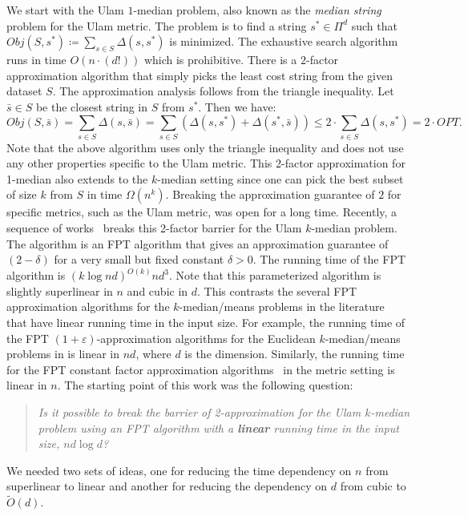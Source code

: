\documentclass[11pt]{llncs}
\newcommand{\veps}{\varepsilon}
\begin{document}
We start with the Ulam $1$-median problem, also known as the {\em median string} problem for the Ulam metric. The problem is to find a string $s^* \in \Pi^d$ such that $Obj(S, s^*) \coloneqq \sum_{s \in S} \Delta(s, s^*)$ is minimized. The exhaustive search algorithm runs in time $O(n \cdot (d!))$ which is prohibitive. There is a $2$-factor approximation algorithm that simply picks the least cost string from the given dataset $S$. The approximation analysis follows from the triangle inequality. Let $\bar{s} \in S$ be the closest string in $S$ from $s^*$. Then we have:
$$
Obj(S, \bar{s}) = \sum_{s \in S} \Delta(s, \bar{s}) = \sum_{s \in S} (\Delta(s, s^*) + \Delta(s^*, \bar{s})) \leq 2 \cdot \sum_{s \in S} \Delta(s, s^*) = 2 \cdot OPT.
$$
Note that the above algorithm uses only the triangle inequality and does not use any other properties specific to the Ulam metric. 
This 2-factor approximation for 1-median also extends to the $k$-median setting since one can pick the best subset of size $k$ from $S$ in time $\Omega(n^k)$. Breaking the approximation guarantee of $2$ for specific metrics, such as the Ulam metric, was open for a long time. Recently, a sequence of works~\cite{cdk21,cdk23} breaks this 2-factor barrier for the Ulam $k$-median problem. The algorithm is an FPT algorithm that gives an approximation guarantee of $(2 - \delta)$ for a very small but fixed constant $\delta > 0$. The running time of the FPT algorithm is $(k \log{nd})^{O(k)} nd^3$. 
Note that this parameterized algorithm is slightly superlinear in $n$ and cubic in $d$.
This contrasts the several FPT approximation algorithms for the $k$-median/means problems in the literature~\cite{kss,jks,bjk18,bgjk20,gj20} that have linear running time in the input size. For example, the running time of the FPT $(1+\veps)$-approximation algorithms for the Euclidean $k$-median/means problems in \cite{kss,jks,bjk18,bgjk20}  is linear in $nd$, where $d$ is the dimension. Similarly, the running time for the FPT constant factor approximation algorithms~\cite{gj20} in the metric setting is linear in $n$. The starting point of this work was the following question: 
\begin{quote}
{\it Is it possible to break the barrier of 2-approximation for the Ulam $k$-median problem using an FPT algorithm with a {\bf linear} running time in the input size, $nd \log{d}$?}
\end{quote}
We needed two sets of ideas, one for reducing the time dependency on $n$ from superlinear to linear and another for reducing the dependency on $d$ from cubic to $\tilde{O}(d)$. 
\end{document}
